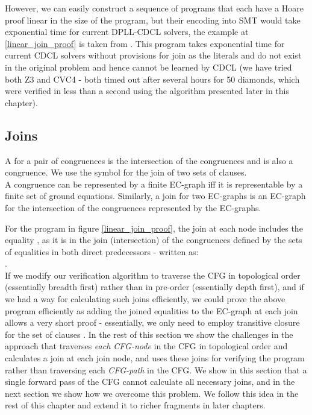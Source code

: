 However, we can easily construct a sequence of programs that each have a Hoare proof linear in the size of the program, but their encoding into SMT would take exponential time for current DPLL-CDCL solvers, the example at \ref{linear_join_proof} is taken from \cite{DPLLJoin}.
This program takes exponential time for current CDCL solvers without provisions for join as the literals  and  do not exist in the original problem and hence cannot be learned by CDCL (we have tried both Z3 and CVC4 - both timed out after several hours for 50 diamonds, which were verified in less than a second using the algorithm presented later in this chapter). 

\subsection{Joins}
A  for a pair of congruences is the intersection of the congruences and is also a congruence. We use the symbol \newdef{\m{\sqcup}} for the join of two sets of clauses.\\
A congruence can be represented by a finite EC-graph iff it is representable by a finite set of ground equations.
Similarly, a join for two EC-graphs is an EC-graph for the intersection of the congruences represented by the EC-graphs.

For the program in figure \ref{linear_join_proof}, the join at each node  includes the equality ,
as it is in the join (intersection) of the congruences defined by the sets of equalities in both direct predecessors - written as:\\
.\\
If we modify our verification algorithm to traverse the CFG in topological order (essentially breadth first) rather than in pre-order (essentially depth first), and if we had a way for calculating such joins efficiently, we could prove the above program efficiently as adding the joined equalities to the EC-graph at each join allows a very short proof - essentially, we only need to employ transitive closure for the set of clauses . 
In the rest of this section we show the challenges in the approach that traverses \emph{each CFG-node} in the CFG in topological order and calculates a join at each join node, and uses these joins for verifying the program rather than traversing each \emph{CFG-path} in the CFG. We show in this section that a single forward pass of the CFG cannot calculate all necessary joins, 
and in the next section we show how we overcome this problem. We follow this idea in the rest of this chapter and extend it to richer fragments in later chapters.


